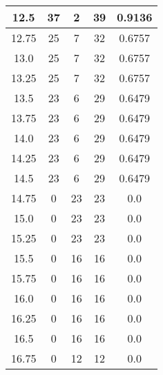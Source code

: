 \documentclass[letterpaper, 12pt]{article}
\begin{document}
\begin{longtable}{|c|c|c|c|c|}
12.5 & 37 & 2 & 39 & 0.9136 \\
\hline
12.75 & 25 & 7 & 32 & 0.6757 \\
\hline
13.0 & 25 & 7 & 32 & 0.6757 \\
\hline
13.25 & 25 & 7 & 32 & 0.6757 \\
\hline
13.5 & 23 & 6 & 29 & 0.6479 \\
\hline
13.75 & 23 & 6 & 29 & 0.6479 \\
\hline
14.0 & 23 & 6 & 29 & 0.6479 \\
\hline
14.25 & 23 & 6 & 29 & 0.6479 \\
\hline
14.5 & 23 & 6 & 29 & 0.6479 \\
\hline
14.75 & 0 & 23 & 23 & 0.0 \\
\hline
15.0 & 0 & 23 & 23 & 0.0 \\
\hline
15.25 & 0 & 23 & 23 & 0.0 \\
\hline
15.5 & 0 & 16 & 16 & 0.0 \\
\hline
15.75 & 0 & 16 & 16 & 0.0 \\
\hline
16.0 & 0 & 16 & 16 & 0.0 \\
\hline
16.25 & 0 & 16 & 16 & 0.0 \\
\hline
16.5 & 0 & 16 & 16 & 0.0 \\
\hline
16.75 & 0 & 12 & 12 & 0.0 \\
\hline
\end{longtable}
\end{document}

